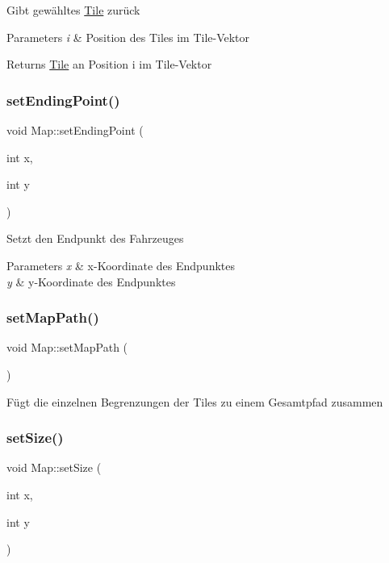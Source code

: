 Gibt gewähltes \mbox{\hyperlink{class_tile}{Tile}} zurück 
\begin{DoxyParams}{Parameters}
{\em i} & Position des Tiles im Tile-\/\+Vektor \\
\hline
\end{DoxyParams}
\begin{DoxyReturn}{Returns}
\mbox{\hyperlink{class_tile}{Tile}} an Position i im Tile-\/\+Vektor 
\end{DoxyReturn}
\mbox{\label{class_map_aedbdf210bf5ec2b87fa834e8e20b16dd}} 
\subsubsection{\texorpdfstring{set\+Ending\+Point()}{setEndingPoint()}}
{\footnotesize\ttfamily void Map\+::set\+Ending\+Point (\begin{DoxyParamCaption}\item[{int}]{x,  }\item[{int}]{y }\end{DoxyParamCaption})}

Setzt den Endpunkt des Fahrzeuges 
\begin{DoxyParams}{Parameters}
{\em x} & x-\/\+Koordinate des Endpunktes \\
\hline
{\em y} & y-\/\+Koordinate des Endpunktes \\
\hline
\end{DoxyParams}
\mbox{\label{class_map_a575b2a270c179acb59b5809b4fa1dfeb}} 
\subsubsection{\texorpdfstring{set\+Map\+Path()}{setMapPath()}}
{\footnotesize\ttfamily void Map\+::set\+Map\+Path (\begin{DoxyParamCaption}{ }\end{DoxyParamCaption})}

Fügt die einzelnen Begrenzungen der Tiles zu einem Gesamtpfad zusammen \mbox{\label{class_map_a483c836df20db96ba2f7118f7b3c2dfd}} 
\subsubsection{\texorpdfstring{set\+Size()}{setSize()}}
{\footnotesize\ttfamily void Map\+::set\+Size (\begin{DoxyParamCaption}\item[{int}]{x,  }\item[{int}]{y }\end{DoxyParamCaption})}

